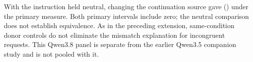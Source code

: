 With the instruction held neutral, changing the continuation source gave
\QEXAstraInclusiveNeutral{} (\QEXAstraInclusiveNeutralCI{}) under the
primary measure. Both primary intervals include zero; the neutral comparison
does not establish equivalence. As in the preceding extension, same-condition
donor controls do not eliminate the mismatch explanation for incongruent
requests. This Qwen3.8 panel is separate from the earlier Qwen3.5 companion
study and is not pooled with it.
